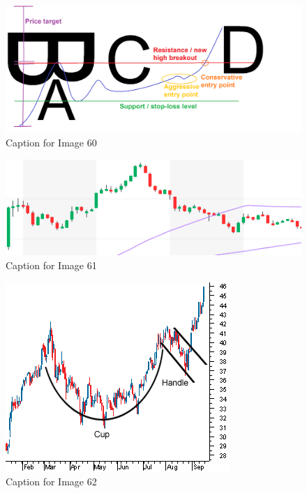 \documentclass{article}
\begin{document}
\vspace{10pt}

\begin{figure}[!htb]
    \centering
    \includegraphics[width=\textwidth]{imgs/60.png}
    \caption{Caption for Image 60}
\end{figure}

\vspace{10pt}

\begin{figure}[!htb]
    \centering
    \includegraphics[width=\textwidth]{imgs/61.png}
    \caption{Caption for Image 61}
\end{figure}

\vspace{10pt}

\begin{figure}[!htb]
    \centering
    \includegraphics[width=\textwidth]{imgs/62.png}
    \caption{Caption for Image 62}
\end{figure}
\end{document}

